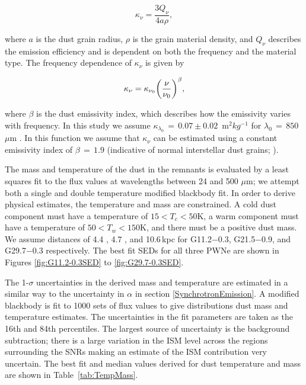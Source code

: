 \documentclass[fleqn,usenatbib]{mnras}
\begin{document}
{\begin{equation} \label{eqn:MAC1}
	\kappa_\nu = \frac{3 Q_\nu}{4 a\rho},
\end{equation}

where $a$ is the dust grain radius, $\rho$ is the grain material density, and $Q_\nu$ describes the emission efficiency and is dependent on both the frequency and the material type. The frequency dependence of $\kappa_\nu$ is given by

\begin{equation} \label{eqn:MAC2}
	\centering
	\kappa_\nu = \kappa_{\nu_0}\bigg(\frac{\nu}{\nu_0}\bigg)^{\beta},
\end{equation}

where $\beta$ is the dust emissivity index, which describes how the emissivity varies with frequency. In this study we assume $\kappa_{\lambda_0}\,=\,0.07 \pm 0.02$~m$^2 kg^{-1}$ for $\lambda_0\,=\,850$~$\mu$m \citep{Dunne2000, James2002, Clark2016}. In this function we assume that $\kappa_\nu$ can be estimated using a constant emissivity index of $\beta\,=\,1.9$ (indicative of normal interstellar dust grains; \citealp{Planck2014}).

The mass and temperature of the dust in the remnants is evaluated by a least squares fit to the flux values at wavelengths between 24 and 500 $\mu$m; we attempt both a single and double temperature modified blackbody fit. In order to derive physical estimates, the temperature and mass are constrained. A cold dust component must have a temperature of $15 < T_c < 50$K, a warm component must have a temperature of $50 < T_w < 150$K, and there must be a positive dust mass. We assume distances of 4.4 \citep{Green2004}, 4.7 \citep{Camilo2005}, and 10.6\,kpc \citep{Su2009} for G11.2$-$0.3, G21.5$-$0.9, and G29.7$-$0.3 respectively.
The best fit SEDs for all three PWNe are shown in Figures \ref{fig:G11.2-0.3SED} to \ref{fig:G29.7-0.3SED}.

The 1-$\sigma$ uncertainties in the derived mass and temperature are estimated in a similar way to the uncertainty in $\alpha$ in section \ref{SynchrotronEmission}. A modified blackbody is fit to 1000 sets of flux values to give distributions dust mass and temperature estimates. The uncertainties in the fit parameters are taken as the 16th and 84th percentiles. The largest source of uncertainty is the background subtraction; there is a large variation in the ISM level across the regions surrounding the SNRs making an estimate of the ISM contribution very uncertain.
The best fit and median values derived for dust temperature and mass are shown in Table~\ref{tab:TempMass}.
\bigskip

}
\end{document}
